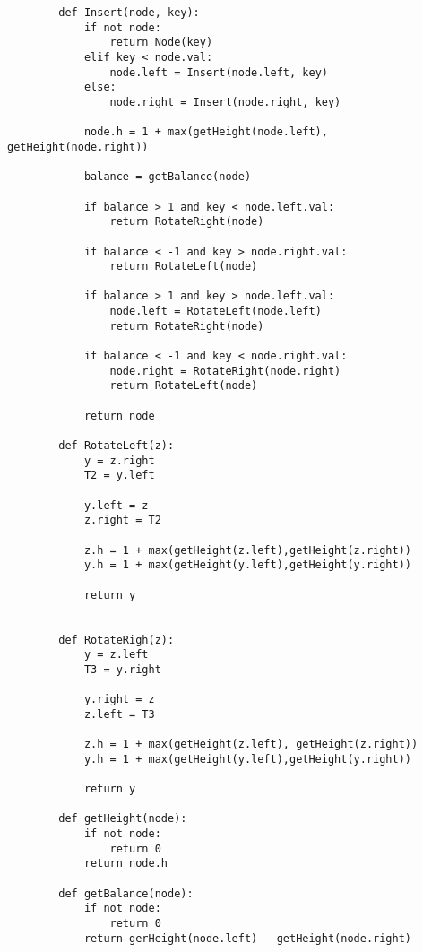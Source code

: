 \documentclass[10pt,a4paper]{article}
\begin{document}
    \begin{lstlisting}
        def Insert(node, key):
            if not node:
                return Node(key)
            elif key < node.val:
                node.left = Insert(node.left, key)
            else:
                node.right = Insert(node.right, key)

            node.h = 1 + max(getHeight(node.left), getHeight(node.right))
            
            balance = getBalance(node)

            if balance > 1 and key < node.left.val:
                return RotateRight(node)

            if balance < -1 and key > node.right.val:        
                return RotateLeft(node)
         
            if balance > 1 and key > node.left.val:
                node.left = RotateLeft(node.left)        
                return RotateRight(node)
  
            if balance < -1 and key < node.right.val:
                node.right = RotateRight(node.right)
                return RotateLeft(node)
         
            return node            
        
        def RotateLeft(z):
            y = z.right
            T2 = y.left
     
            y.left = z
            z.right = T2
   
            z.h = 1 + max(getHeight(z.left),getHeight(z.right))
            y.h = 1 + max(getHeight(y.left),getHeight(y.right))

            return y
     
    
        def RotateRigh(z):
            y = z.left
            T3 = y.right
     
            y.right = z
            z.left = T3
     
            z.h = 1 + max(getHeight(z.left), getHeight(z.right))
            y.h = 1 + max(getHeight(y.left),getHeight(y.right))
     
            return y
        
        def getHeight(node):
            if not node:
                return 0
            return node.h

        def getBalance(node):
            if not node:
                return 0
            return gerHeight(node.left) - getHeight(node.right)

    \end{lstlisting}
\end{document}
